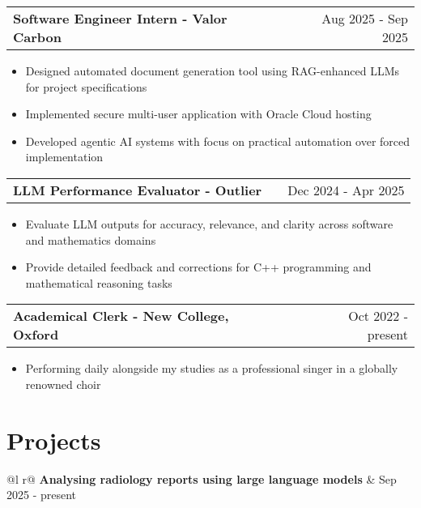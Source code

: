 \documentclass[a4paper,10pt]{article}
\makeatletter
\newenvironment{joblong}[2]
    {
    \begin{tabularx}{\linewidth}{@{}l X r@{}}
    \textbf{#1} & \hfill &  #2 \\[2pt]
    \end{tabularx}
    \begin{minipage}[t]{\linewidth}
    \begin{itemize}[nosep,after=\strut, leftmargin=1em, itemsep=1pt,label=--]
    }
    {
    \end{itemize}
    \end{minipage}    
    }
\makeatother
\begin{document}
\vspace{1pt}

\begin{joblong}{Software Engineer Intern - Valor Carbon}{Aug 2025 - Sep 2025}
\item Designed automated document generation tool using RAG-enhanced LLMs for project specifications
\item Implemented secure multi-user application with Oracle Cloud hosting
\item Developed agentic AI systems with focus on practical automation over forced implementation
\end{joblong}

\vspace{1pt}

\begin{joblong}{LLM Performance Evaluator - Outlier}{Dec 2024 - Apr 2025}
\item Evaluate LLM outputs for accuracy, relevance, and clarity across software and mathematics domains
\item Provide detailed feedback and corrections for C++ programming and mathematical reasoning tasks
\end{joblong}

\vspace{1pt}

\begin{joblong}{Academical Clerk - New College, Oxford}{Oct 2022 - present}
\item Performing daily alongside my studies as a professional singer in a globally renowned choir
\end{joblong}

\section{Projects}

\begin{tabularx}{\linewidth}{ @{}l r@{} }
\textbf{Analysing radiology reports using large language models} & \hfill Sep 2025 - present \\[2pt]
  \\
\end{tabularx}

\vspace{1pt}
\end{document}
